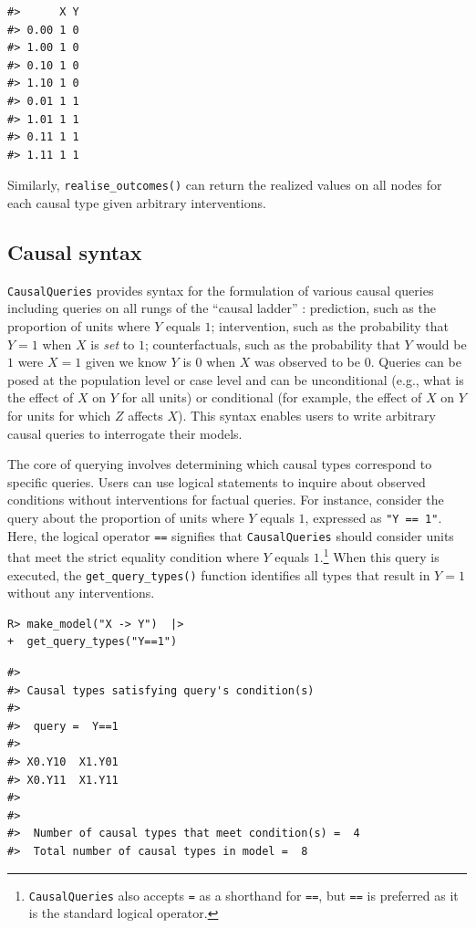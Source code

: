 \documentclass[
  11pt,
  article]{jss}
\begin{document}
\begin{verbatim}
#>      X Y
#> 0.00 1 0
#> 1.00 1 0
#> 0.10 1 0
#> 1.10 1 0
#> 0.01 1 1
#> 1.01 1 1
#> 0.11 1 1
#> 1.11 1 1
\end{verbatim}

Similarly, \texttt{realise\_outcomes()} can return the realized values
on all nodes for each causal type given arbitrary interventions.

\subsection{Causal syntax}\label{sec-syntax}

\texttt{CausalQueries} provides syntax for the formulation of various
causal queries including queries on all rungs of the ``causal ladder''
\citep{pearl_causality_2009}: prediction, such as the proportion of
units where \(Y\) equals \(1\); intervention, such as the probability
that \(Y = 1\) when \(X\) is \emph{set} to \(1\); counterfactuals, such
as the probability that \(Y\) would be \(1\) were \(X = 1\) given we
know \(Y\) is \(0\) when \(X\) was observed to be \(0\). Queries can be
posed at the population level or case level and can be unconditional
(e.g., what is the effect of \(X\) on \(Y\) for all units) or
conditional (for example, the effect of \(X\) on \(Y\) for units for
which \(Z\) affects \(X\)). This syntax enables users to write arbitrary
causal queries to interrogate their models.

The core of querying involves determining which causal types correspond
to specific queries. Users can use logical statements to inquire about
observed conditions without interventions for factual queries. For
instance, consider the query about the proportion of units where \(Y\)
equals \(1\), expressed as \texttt{"Y\ ==\ 1"}. Here, the logical
operator \texttt{==} signifies that \texttt{CausalQueries} should
consider units that meet the strict equality condition where \(Y\)
equals \(1\).\footnote{\texttt{CausalQueries} also accepts \texttt{=} as
  a shorthand for \texttt{==}, but \texttt{==} is preferred as it is the
  standard logical operator.} When this query is executed, the
\texttt{get\_query\_types()} function identifies all types that result
in \(Y=1\) without any interventions.

\begin{verbatim}
R> make_model("X -> Y")  |> 
+  get_query_types("Y==1")
\end{verbatim}

\begin{verbatim}
#> 
#> Causal types satisfying query's condition(s)  
#> 
#>  query =  Y==1 
#> 
#> X0.Y10  X1.Y01
#> X0.Y11  X1.Y11
#> 
#> 
#>  Number of causal types that meet condition(s) =  4
#>  Total number of causal types in model =  8
\end{verbatim}
\end{document}
